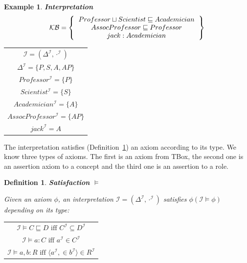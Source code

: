 \documentclass[12pt,a4paper]{article}
\newtheorem{definition}{Definition}[subsection]
\newtheorem{example}{Example}[subsection]
\begin{document}
\begin{example}{\textbf{Interpretation}}
	\[ 
	\mathcal{KB} = \left\{
	\begin{tabular}{c c}
	$Professor \sqcup Scientist \sqsubseteq Academician$ \\
	$AssocProfessor \sqsubseteq Professor$ \\
	$jack : Academician$ \\
	\end{tabular}
	\right \}
	\]
	
	\begin{table}[H]
		\centering
		\begin{tabular}{c}
			$ \mathcal{I} = (\Delta ^{\mathcal{I}}, \cdot^{\mathcal{I}}) $ \\
			\addlinespace[0.4cm]
			$ \Delta ^{\mathcal{I}} = \{ P,S,A,AP \} $ \\
			\addlinespace[0.4cm]
			$ Professor^{\mathcal{I}} = \{P\} $ \\
			\addlinespace[0.4cm]
			$ Scientist^{\mathcal{I}} = \{S\} $ \\
			\addlinespace[0.4cm]
			$ Academician^{\mathcal{I}} = \{A\} $ \\
			\addlinespace[0.4cm]
			$ AssocProfessor^{\mathcal{I}} = \{AP\} $ \\
			\addlinespace[0.4cm]
			$ jack^{\mathcal{I}} = A $
		\end{tabular}
	\end{table}

\end{example}

The interpretation satisfies (Definition~\ref{def:satisfaction}) an axiom according to its type. We know three types of axioms. The first is an axiom from TBox, the second one is an assertion axiom to a concept and the third one is an assertion to a role.

\begin{definition}{\textbf{Satisfaction $\models$}}
	\label{def:satisfaction}

	Given an axiom $\phi$, an interpretation $\mathcal{I} = (\Delta^{\mathcal{I}}, \cdot ^{\mathcal{I}})$ satisfies $\phi (\mathcal{I} \models \phi)$ depending on its type:
	
	\begin{table}[H]
		\centering
		\begin{tabular}{c}
			$ \mathcal{I} \models C \sqsubseteq D \text{ iff } C^{\mathcal{I}} \subseteq D^{\mathcal{I}} $ \\
			\addlinespace[0.4cm]
			$ \mathcal{I} \models a:C \text{ iff } a^{\mathcal{I}} \in C^{\mathcal{I}} $ \\
			\addlinespace[0.4cm]
			$ \mathcal{I} \models a,b:R \text{ iff } \langle a^{\mathcal{I}}, \in b^{\mathcal{I}} \rangle \in R^{\mathcal{I}} $
		\end{tabular}
	\end{table}

\end{definition}
\end{document}
